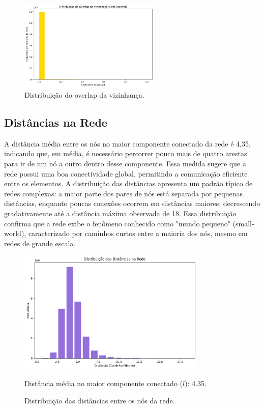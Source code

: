 \documentclass[12pt, a4paper]{article}
\begin{document}
\begin{figure}[H]
    \centering
    \includegraphics[width=0.6\textwidth]{dist.png}
    \caption{Distribuição do overlap da vizinhança.}
    \label{fig:dist_overlap}
\end{figure}

\subsection{Distâncias na Rede}
A distância média entre os nós no maior componente conectado da rede é 4,35, indicando que, em média, é necessário percorrer pouco mais de quatro arestas para ir de um nó a outro dentro desse componente. Essa medida sugere que a rede possui uma boa conectividade global, permitindo a comunicação eficiente entre os elementos. A distribuição das distâncias apresenta um padrão típico de redes complexas: a maior parte dos pares de nós está separada por pequenas distâncias, enquanto poucas conexões ocorrem em distâncias maiores, decrescendo gradativamente até a distância máxima observada de 18. Essa distribuição confirma que a rede exibe o fenômeno conhecido como "mundo pequeno" (small-world), caracterizado por caminhos curtos entre a maioria dos nós, mesmo em redes de grande escala.

\begin{figure}[H]
    \centering
    \includegraphics[width=0.8\textwidth]{distancias.png}
    \caption{Distribuição das distâncias entre os nós da rede.}
    \label{fig:dist_distancias}
Distância média no maior componente conectado ($l$): 4.35.
\end{figure}
\end{document}
